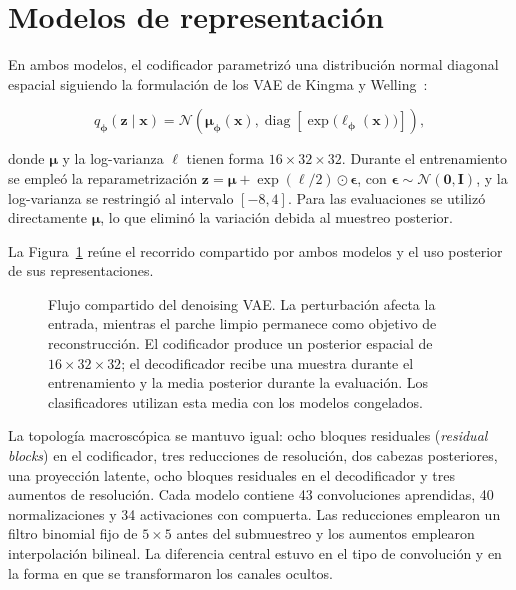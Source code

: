 \section{Modelos de representación}

En ambos modelos, el codificador parametrizó una distribución normal diagonal
espacial siguiendo la formulación de los VAE de
Kingma y Welling~\cite{kingma_autoencoding_2014}:

\begin{equation}
    q_{\boldsymbol{\phi}}(\mathbf{z}\mid\mathbf{x})
    =\mathcal{N}\!\left(
        \boldsymbol{\mu}_{\boldsymbol{\phi}}(\mathbf{x}),
        \operatorname{diag}\!\left[
            \exp\!\big(\boldsymbol{\ell}_{\boldsymbol{\phi}}(\mathbf{x})\big)
        \right]\right),
    \label{eq:posterior-vae}
\end{equation}

donde \(\boldsymbol{\mu}\) y la log-varianza
\(\boldsymbol{\ell}\) tienen forma \(16\times32\times32\). Durante el
entrenamiento se empleó la reparametrización
\(\mathbf{z}=\boldsymbol{\mu}+\exp(\boldsymbol{\ell}/2)\odot
\boldsymbol{\epsilon}\), con
\(\boldsymbol{\epsilon}\sim\mathcal{N}(\mathbf{0},\mathbf{I})\), y la
log-varianza se restringió al intervalo \([-8,4]\). Para las evaluaciones se
utilizó directamente \(\boldsymbol{\mu}\), lo que eliminó la variación debida
al muestreo posterior.

La Figura~\ref{fig:flujo-denoising-vae} reúne el recorrido compartido por
ambos modelos y el uso posterior de sus representaciones.

\begin{figure}[htbp]
    \centering
    \begingroup{}
    \resizebox{\textwidth}{!}{}
    \endgroup
    \caption{Flujo compartido del denoising VAE. La perturbación afecta la
    entrada, mientras el parche limpio permanece como objetivo de reconstrucción.
    El codificador produce un posterior espacial de \(16\times32\times32\);
    el decodificador recibe una muestra durante el entrenamiento y la media
    posterior durante la evaluación. Los clasificadores utilizan esta media
    con los modelos congelados.}
    \label{fig:flujo-denoising-vae}
\end{figure}

La topología macroscópica se mantuvo igual: ocho bloques residuales
(\emph{residual blocks}) en el
codificador, tres reducciones de resolución, dos cabezas posteriores, una
proyección latente, ocho bloques residuales en el decodificador y tres
aumentos de resolución. Cada modelo contiene 43 convoluciones aprendidas, 40
normalizaciones y 34 activaciones con compuerta. Las reducciones emplearon un
filtro binomial fijo de \(5\times5\) antes del submuestreo y los aumentos
emplearon interpolación bilineal. La diferencia central estuvo en el tipo de
convolución y en la forma en que se transformaron los canales ocultos.

